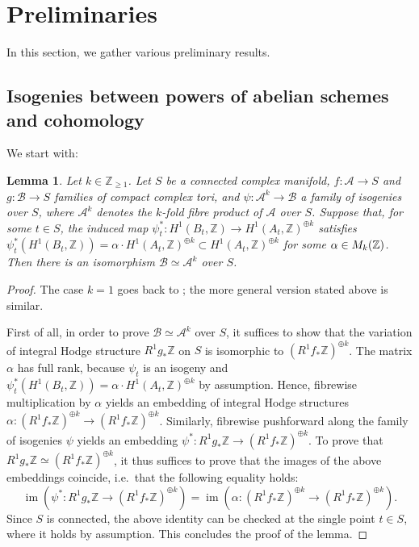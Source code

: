 \documentclass[a4paper,11pt,reqno]{amsart}
\numberwithin{equation}{section}
\theoremstyle{plain}
\newtheorem{lemma}[theorem]{Lemma}
\theoremstyle{definition}
\newcommand{\Z}{\mathbb Z}
\let\rm\relax
\newcommand{\rm}[1]{{\mathrm{#1}}}
\newcommand{\im}{\operatorname{im}}
\newcommand{\ca}[1]{{\mathcal{#1}}}
\renewcommand{\cong}{\simeq}
\begin{document}
\section{Preliminaries} \label{section:setup}

In this section, we gather various preliminary results. 
 
\subsection{Isogenies between powers of abelian schemes and cohomology} We start with:

\begin{lemma} \label{lemma:isogenyVHS}
Let $k \in \Z_{\geq 1}$. Let $S$ be a connected complex manifold, $f \colon \ca A \to S$ and $g \colon \ca B \to S$ families of compact complex tori, and $\psi \colon \ca  A^k \to \ca B$ a family of isogenies over $S$, where $\mathcal A^k$ denotes the $k$-fold fibre product of $\mathcal A$ over $S$.  
Suppose that, for some $t \in S$, the induced map $\psi_t^\ast \colon H^1(B_t,\Z) \to H^1(A_t,\Z)^{\oplus k}$ satisfies $\psi_t^\ast (H^1(B_t,\Z)) = \alpha \cdot H^1(A_t,\Z)^{\oplus k} \subset H^1(A_t,\Z)^{\oplus k}$ for some $\alpha \in \rm{M}_k(\Z)$.  
Then there is an isomorphism $\ca B \cong \ca A^k$ over $S$.  
\end{lemma}

\begin{proof}
The case $k=1$ goes back to \cite{bardellipirola-curvesofgenusg}; the more general version stated above is similar.

First of all, in order to prove $\ca B \cong \ca A^k$ over $S$, it suffices to show that the variation of integral Hodge structure $ R^1g_\ast\Z$ on $S$ is isomorphic to $(R^1f_\ast\Z)^{\oplus k}$.
The matrix $\alpha$ has full rank, because $\psi_t$ is an isogeny and $\psi_t^\ast (H^1(B_t,\Z)) = \alpha \cdot H^1(A_t,\Z)^{\oplus k} $ by assumption.
Hence, fibrewise multiplication by $\alpha$ yields an embedding of integral Hodge structures $\alpha\colon  (R^1f_\ast\Z)^{\oplus k} \to (R^1f_\ast\Z)^{\oplus k}$.
Similarly, fibrewise pushforward along the family of isogenies $\psi$ yields an embedding $ \psi^\ast\colon  R^1g_\ast\Z \to (R^1f_\ast\Z)^{\oplus k}$.
To prove that  $ R^1g_\ast\Z\cong (R^1f_\ast\Z)^{\oplus k}$, it thus suffices to prove that the images of the above embeddings coincide, i.e.\ that the following equality holds:
$$
\im(\psi^\ast\colon  R^1g_\ast\Z \to (R^1f_\ast\Z)^{\oplus k})=\im(\alpha\colon  (R^1f_\ast\Z)^{\oplus k} \to (R^1f_\ast\Z)^{\oplus k} ).
$$
Since $S$ is connected, the above identity can be checked at the single point $t\in S$, where it holds by assumption.
This concludes the proof of the lemma. 
\end{proof}
\end{document}
